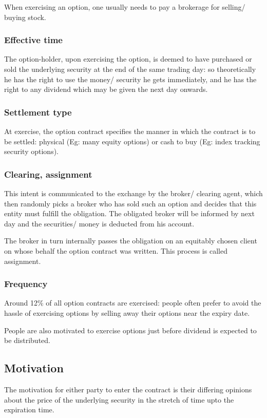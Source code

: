 \documentclass[oneside, article]{memoir}
\begin{document}
When exercising an option, one usually needs to pay a brokerage for selling/ buying stock.

\subsubsection{Effective time}
The option-holder, upon exercising the option, is deemed to have purchased or sold the underlying security at the end of the same trading day: so theoretically he has the right to use the money/ security he gets immediately, and he has the right to any dividend which may be given the next day onwards.

\subsubsection{Settlement type}
At exercise, the option contract specifies the manner in which the contract is to be settled: physical (Eg: many equity options) or cash to buy (Eg: index tracking security options).

\subsubsection{Clearing, assignment}
This intent is communicated to the exchange by the broker/ clearing agent, which then randomly picks a broker who has sold such an option and decides that this entity must fulfill the obligation. The obligated broker will be informed by next day and the securities/ money is deducted from his account.

The broker in turn internally passes the obligation on an equitably chosen client on whose behalf the option contract was written. This process is called assignment.



\subsubsection{Frequency}
Around 12\% of all option contracts are exercised: people often prefer to avoid the hassle of  exercising options by selling away their options near the expiry date.

People are also motivated to exercise options just before dividend is expected to be distributed.

\subsection{Motivation}
The motivation for either party to enter the contract is their differing opinions about the price of the underlying security in the stretch of time upto the expiration time.
\end{document}
